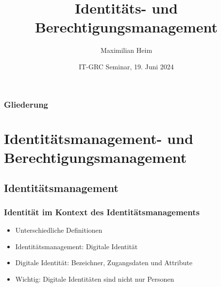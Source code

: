 \documentclass[11pt]{beamer}
\author{Maximilian Heim\inst{1}}
\institute[HS-AS]
{
  \inst{1}
  Hochschule Albstadt-Sigmaringen
}
\title{Identitäts- und Berechtigungsmanagement}
\date[IT-GRC 2024 SoSe]{IT-GRC Seminar, 19. Juni 2024}
\begin{document}
\frame{\titlepage}
\begin{frame}
  \frametitle{Gliederung}
  \tableofcontents
\end{frame}
\section{Identitätsmanagement- und Berechtigungsmanagement}
\subsection{Identitätsmanagement}
\begin{frame}
  \frametitle{Identität im Kontext des Identitätsmanagements}
  \begin{itemize}
    \item Unterschiedliche Definitionen
    \item Identitätsmanagement: Digitale Identität
    \item Digitale Identität: Bezeichner, Zugangsdaten und Attribute
    \item Wichtig: Digitale Identitäten sind nicht nur Personen~
  \end{itemize}
\end{frame}
\end{document}
